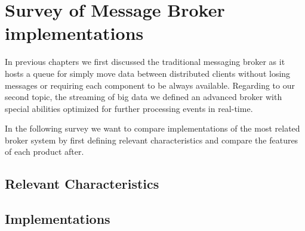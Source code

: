 \chapter{Survey of Message Broker implementations} 
\label{survey-broker}
In previous chapters we first discussed the traditional messaging broker as it hosts a queue
for simply move data between distributed clients without losing messages or
requiring each component to be always available. Regarding to our second topic,
the streaming of big data we defined an advanced broker with special abilities
optimized for further processing events in real-time. 

In the following survey we want to compare implementations of the most related
broker system by first defining relevant characteristics and compare the
features of each product after.

\section{Relevant Characteristics}

\section{Implementations}

